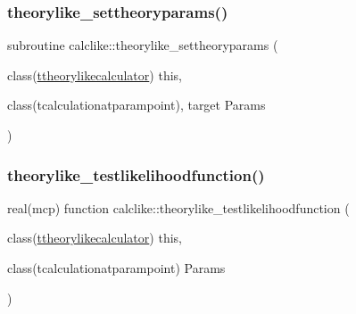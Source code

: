 \mbox{\label{namespacecalclike_ab9d66863dbce892dbee08483d9cdac50}} 
\subsubsection{\texorpdfstring{theorylike\+\_\+settheoryparams()}{theorylike\_settheoryparams()}}
{\footnotesize\ttfamily subroutine calclike\+::theorylike\+\_\+settheoryparams (\begin{DoxyParamCaption}\item[{class(\mbox{\hyperlink{structcalclike_1_1ttheorylikecalculator}{ttheorylikecalculator}})}]{this,  }\item[{class(tcalculationatparampoint), target}]{Params }\end{DoxyParamCaption})\hspace{0.3cm}{\ttfamily [private]}}

\mbox{\label{namespacecalclike_adb2986867dcdb441b12b98cdd46cc5b5}} 
\subsubsection{\texorpdfstring{theorylike\+\_\+testlikelihoodfunction()}{theorylike\_testlikelihoodfunction()}}
{\footnotesize\ttfamily real(mcp) function calclike\+::theorylike\+\_\+testlikelihoodfunction (\begin{DoxyParamCaption}\item[{class(\mbox{\hyperlink{structcalclike_1_1ttheorylikecalculator}{ttheorylikecalculator}})}]{this,  }\item[{class(tcalculationatparampoint)}]{Params }\end{DoxyParamCaption})\hspace{0.3cm}{\ttfamily [private]}}

\mbox{\label{namespacecalclike_adb244129926744248e4e4f8883384b5c}} 
